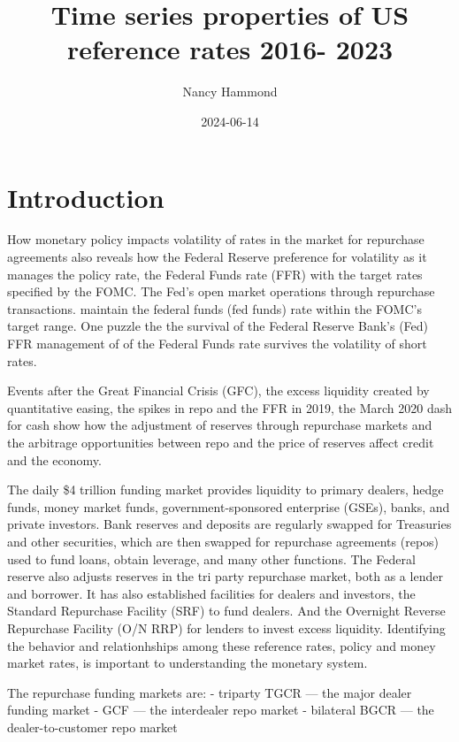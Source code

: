 \documentclass[
]{article}
\title{Time series properties of US reference rates 2016- 2023}
\author{Nancy Hammond}
\date{2024-06-14}
\begin{document}
\maketitle

{
\setcounter{tocdepth}{2}
\tableofcontents
}
\hypertarget{introduction}{%
\section{Introduction}\label{introduction}}

How monetary policy impacts volatility of rates in the market for repurchase agreements also reveals how the Federal Reserve preference for volatility as it manages the policy rate, the Federal Funds rate (FFR) with the target rates specified by the FOMC. The Fed's open market operations through repurchase transactions. maintain the federal funds (fed funds) rate within the FOMC's target range. One puzzle the the survival of the Federal Reserve Bank's (Fed) FFR management of of the Federal Funds rate survives the volatility of short rates.

Events after the Great Financial Crisis (GFC), the excess liquidity created by quantitative easing, the spikes in repo and the FFR in 2019, the March 2020 dash for cash show how the adjustment of reserves through repurchase markets and the arbitrage opportunities between repo and the price of reserves affect credit and the economy.

The daily \$4 trillion funding market provides liquidity to primary dealers, hedge funds, money market funds, government-sponsored enterprise (GSEs), banks, and private investors. Bank reserves and deposits are regularly swapped for Treasuries and other securities, which are then swapped for repurchase agreements (repos) used to fund loans, obtain leverage, and many other functions. The Federal reserve also adjusts reserves in the tri party repurchase market, both as a lender and borrower. It has also established facilities for dealers and investors, the Standard Repurchase Facility (SRF) to fund dealers. And the Overnight Reverse Repurchase Facility (O/N RRP) for lenders to invest excess liquidity. Identifying the behavior and relationhships among these reference rates, policy and money market rates, is important to understanding the monetary system.

The repurchase funding markets are:
- triparty TGCR --- the major dealer funding market
- GCF --- the interdealer repo market
- bilateral BGCR --- the dealer-to-customer repo market
\end{document}
